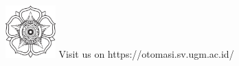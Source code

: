 \documentclass[10pt,xcolor={dvipsnames}]{beamer}
\begin{document}
		\begin{frame}
			\begin{Center}
				\vspace{0.8cm}
				\includegraphics[height=2cm]{Lambang dan logo UGM/Lambang UGM-hitam.png}
				\vspace{0.2cm}
				\newline Visit us on https://otomasi.sv.ugm.ac.id/
				\newline {} 
				\hspace{1cm}
			\end{Center}
		\end{frame}
		
\end{document}
